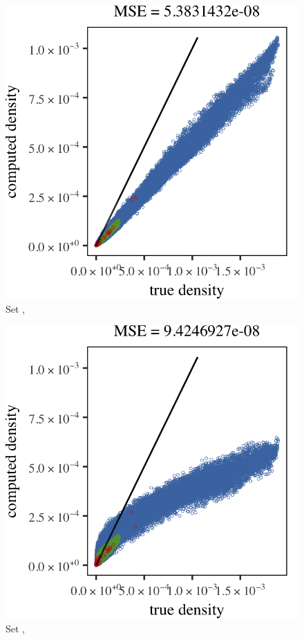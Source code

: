 \begin{subfigure}{0.23\textwidth}
	\centering
	\includegraphics[keepaspectratio=true, width=\textwidth, height=0.23\textheight]{result/img/all/results_baakman_2_60000_mbe_silverman}
	\caption{Set \baakmanTwo, \mbe}
	\label{fig:4:results:mbe:baakman2}
\end{subfigure}
\begin{subfigure}{0.23\textwidth}
	\centering
	\includegraphics[keepaspectratio=true, width=\textwidth, height=0.23\textheight]{result/img/all/results_baakman_2_60000_sambe_silverman}
	\caption{Set \baakmanTwo, \sambe}
	\label{fig:4:simulated:datasets:sambe:baakman2}
\end{subfigure}
